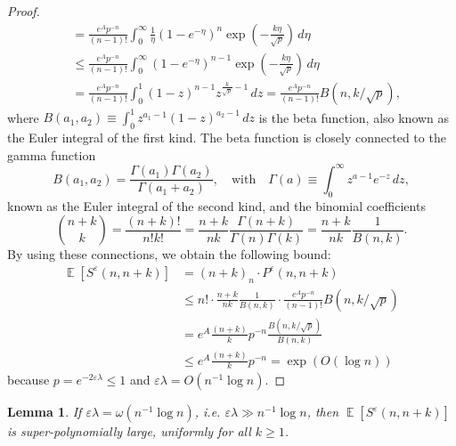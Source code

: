 \documentclass[11pt]{amsart}
\newtheorem{lemma}[theorem]{Lemma}
\newcommand{\E}{\operatorname{\mathbb{E}}}
\def\eps{\varepsilon}
\theoremstyle{remark}
\numberwithin{equation}{section}
\begin{document}
\begin{proof}
\begin{align*}
&=\frac{e^Ap^{-n}}{(n-1)!}\int_0^{\infty} \frac{1}{\eta}(1-e^{-\eta})^n \exp\left({-\frac{k\eta}{\sqrt{p}}}\right)\,d \eta\\
& \leq \frac{e^Ap^{-n}}{(n-1)!}\int_0^{\infty} (1-e^{-\eta})^{n-1} \exp\left({-\frac{k\eta}{\sqrt{p}}}\right)\,d \eta \\
& = \frac{e^Ap^{-n}}{(n-1)!}\int_0^{1} (1-z)^{n-1} z^{\frac{k}{\sqrt{p}}-1}\,d z = \frac{e^Ap^{-n}}{(n-1)!} B(n, k/\sqrt{p}),
\end{align*} 
where 
$B(a_1, a_2) \equiv \int_0^{1} z^{a_1-1} (1-z)^{a_2-1}\,d z$ is the beta function, also known as the Euler integral of the first kind.
The beta function is closely connected to the gamma function
\begin{equation*}
    B(a_1, a_2)=\frac{\Gamma(a_1)\Gamma(a_2)}{\Gamma(a_1+a_2)}, \quad \text{with} \quad \Gamma(a) \equiv  \int_0^{\infty} z^{a-1} e^{-z}\,d z,
\end{equation*}
known as the Euler integral of the second kind, and the binomial coefficients
\begin{equation*}
\binom{n+k}{k} = \frac{(n+k)!}{n!k!}=\frac{n+k}{nk}\frac{\Gamma(n+k)}{\Gamma(n)\Gamma(k)} =\frac{n+k}{nk} \frac{1}{B(n,k)}.
\end{equation*}
By using these connections, we obtain the following bound:
\begin{align*}
\E[S^{\eps}(n,n+k)]
&=(n+k)_n\cdot P^{\eps}(n,n+k)\\
&\leq n! \cdot \frac{n+k}{nk} \frac{1}{B(n,k)} \cdot \frac{e^Ap^{-n}}{(n-1)!} B(n, k/\sqrt{p})\\
&= e^A \frac{(n+k)}{k} p^{-n}\frac{B(n, k/\sqrt{p})}{B(n, k)}\\
&\leq  e^A \frac{(n+k)}{k} p^{-n}=\exp(O(\log n))
\end{align*}
because $p=e^{-2\eps \lambda}\le 1$ and $\eps\lambda=O(n^{-1}\log n)$.
\end{proof}

\begin{lemma}\label{lem4} If $\eps \lambda =\omega(n^{-1}\log n)$, i.e. $\eps \lambda\gg n^{-1}\log n$, then $\E[S^{\eps}(n,n+k)]$ is super-polynomially large, uniformly for all $k\ge 1$. %
\end{lemma}
\end{document}
